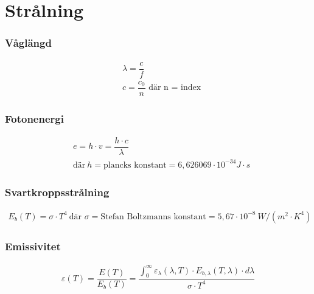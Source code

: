 \section*{Strålning}
\subsubsection*{Våglängd}
\begin{align*}
	&\lambda = \dfrac{c}{f} \\
	& c = \dfrac{c_{0}}{n} \text{ där n = index}
\end{align*}
\subsubsection*{Fotonenergi}
\begin{align*}
	& e = h \cdot v = \dfrac{h \cdot c}{\lambda}\\
	& \text{där} \ h = \text{plancks konstant} = 6,626069 \cdot 10^{-34} J \cdot s
\end{align*}
\subsubsection*{Svartkroppsstrålning}
\begin{align*}
	E_b(T)=\sigma \cdot T^4 \
	\text{där } \sigma = \text{Stefan Boltzmanns konstant} = 5,67 \cdot 10^{-8} \ W/(m^2 \cdot K^4) 
\end{align*}
\subsubsection*{Emissivitet}
\begin{align*}
	\varepsilon(T)	= \dfrac{E(T)}{E_b(T)} = \dfrac{\int_{0}^\infty \varepsilon_\lambda(\lambda, T) \cdot E_{b,\lambda}(T,\lambda) \cdot d\lambda}{\sigma \cdot T^4}
\end{align*}
